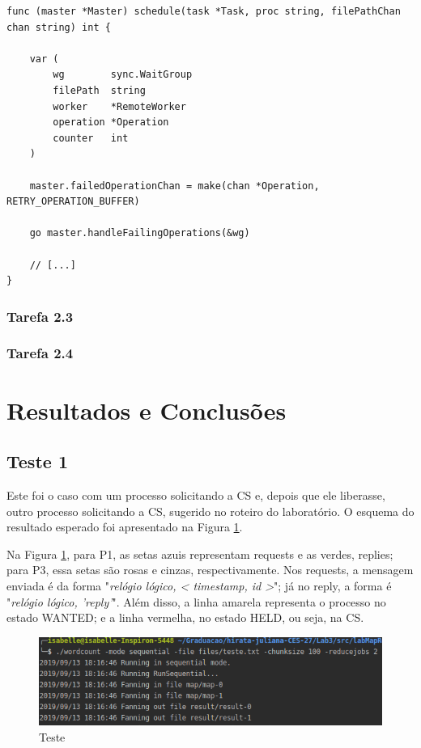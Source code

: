 \documentclass[conference]{IEEEtran}
\begin{document}
\begin{lstlisting}
func (master *Master) schedule(task *Task, proc string, filePathChan chan string) int {

	var (
		wg        sync.WaitGroup
		filePath  string
		worker    *RemoteWorker
		operation *Operation
		counter   int
	)
	
	master.failedOperationChan = make(chan *Operation, RETRY_OPERATION_BUFFER)

	go master.handleFailingOperations(&wg)

	// [...]
}
\end{lstlisting}

\subsubsection{Tarefa 2.3}

\subsubsection{Tarefa 2.4}


\section{Resultados e Conclusões} \label{results}

\subsection{Teste 1}

	Este foi o caso com um processo solicitando a CS e, depois que ele liberasse, outro processo solicitando a CS, sugerido no roteiro do laboratório. O esquema do resultado esperado foi apresentado na Figura \ref{ex1}.
	
	Na Figura \ref{ex1}, para P1, as setas azuis representam requests e as verdes, replies; para P3, essa setas são rosas e cinzas, respectivamente. Nos requests, a mensagem enviada é da forma "\textit{relógio lógico, < timestamp, id >}"; já no reply, a forma é "\textit{relógio lógico, 'reply'}". Além disso, a linha amarela representa o processo no estado WANTED; e a linha vermelha, no estado HELD, ou seja, na CS.
	
\begin{figure}[H]
\centering
\centerline{\includegraphics[scale=0.3]{imagens/tarefa_1_3/tarefa_1_3.png}}
\caption{Teste}
\label{ex1}
\end{figure}
\end{document}
